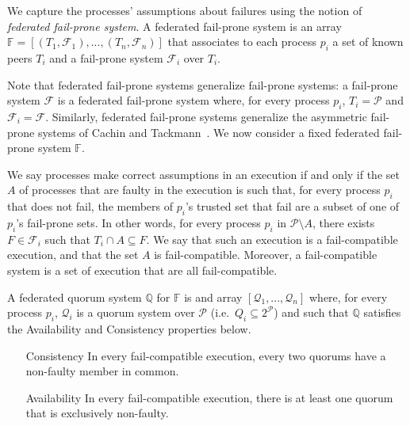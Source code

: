 \documentclass[11pt,letterpaper]{article}
\begin{document}
We capture the processes' assumptions about failures using the notion of \emph{federated fail-prone system}. A federated fail-prone system is an array $\mathbb{F}=\left[\left(T_1,\mathcal{F}_1\right),...,\left(T_n,\mathcal{F}_n\right)\right]$ that associates to each process $p_i$ a set of known peers $T_i$ and a fail-prone system $\mathcal{F}_i$ over $T_i$.

Note that federated fail-prone systems generalize fail-prone systems: a fail-prone system $\mathcal{F}$ is a federated fail-prone system where, for every process $p_i$, $T_i=\mathcal{P}$ and $\mathcal{F}_i=\mathcal{F}$. Similarly, federated fail-prone systems generalize the asymmetric fail-prone systems of Cachin and Tackmann~\cite{cachinAsymmetricDistributedTrust2019}.
We now consider a fixed federated fail-prone system $\mathbb{F}$.

We say processes make correct assumptions in an execution if and only if the set $A$ of processes that are faulty in the execution is such that, for every process $p_i$ that does not fail, the members of $p_i$'s trusted set that fail are a subset of one of $p_i$'s fail-prone sets.
In other words, for every process $p_i$ in $\mathcal{P}\setminus A$, there exists $F\in\mathcal{F}_i$ such that $T_i\cap A \subseteq F$.
We say that such an execution is a fail-compatible execution, and that the set $A$ is fail-compatible.
Moreover, a fail-compatible system is a set of execution that are all fail-compatible.

A federated quorum system $\mathbb{Q}$ for $\mathbb{F}$ is and array $\left[\mathcal{Q}_1,...,\mathcal{Q}_n\right]$ where, for every process $p_i$, $\mathcal{Q}_i$ is a quorum system over $\mathcal{P}$ (i.e.\ $Q_i\subseteq 2^{\mathcal{P}}$) and such that $\mathbb{Q}$ satisfies the Availability and Consistency properties below.
\begin{itemize}
  \item[Consistency] In every fail-compatible execution, every two quorums have a non-faulty member in common.
  \item[Availability] In every fail-compatible execution, there is at least one quorum that is exclusively non-faulty.
\end{itemize}
\end{document}
